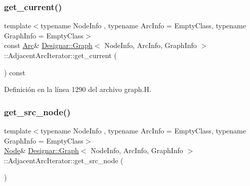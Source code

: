\subsubsection{\texorpdfstring{get\+\_\+current()}{get\_current()}\hspace{0.1cm}{\footnotesize\ttfamily [2/2]}}
{\footnotesize\ttfamily template$<$typename Node\+Info , typename Arc\+Info  = Empty\+Class, typename Graph\+Info  = Empty\+Class$>$ \\
const \hyperlink{class_designar_1_1_graph_a74c730ef4ce2d20f998d72bd25c2b5bf}{Arc}\& \hyperlink{class_designar_1_1_graph}{Designar\+::\+Graph}$<$ Node\+Info, Arc\+Info, Graph\+Info $>$\+::Adjacent\+Arc\+Iterator\+::get\+\_\+current (\begin{DoxyParamCaption}{ }\end{DoxyParamCaption}) const\hspace{0.3cm}{\ttfamily [inline]}}



Definición en la línea 1290 del archivo graph.\+H.

\mbox{\label{class_designar_1_1_graph_1_1_adjacent_arc_iterator_a0a5f3238f6abde756b4498a31558a255}} 
\subsubsection{\texorpdfstring{get\+\_\+src\+\_\+node()}{get\_src\_node()}\hspace{0.1cm}{\footnotesize\ttfamily [1/2]}}
{\footnotesize\ttfamily template$<$typename Node\+Info , typename Arc\+Info  = Empty\+Class, typename Graph\+Info  = Empty\+Class$>$ \\
\hyperlink{class_designar_1_1_graph_a5dfc7dba9d092ac489c72e40390c37d0}{Node}\& \hyperlink{class_designar_1_1_graph}{Designar\+::\+Graph}$<$ Node\+Info, Arc\+Info, Graph\+Info $>$\+::Adjacent\+Arc\+Iterator\+::get\+\_\+src\+\_\+node (\begin{DoxyParamCaption}{ }\end{DoxyParamCaption})\hspace{0.3cm}{\ttfamily [inline]}}



